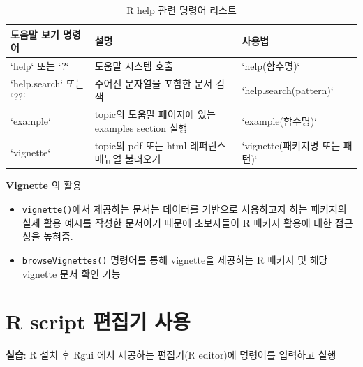 \documentclass[
  11pt,
]{krantz}
\makeatletter
\providecommand{\tightlist}{%
  \setlength{\itemsep}{0pt}\setlength{\parskip}{0pt}}
\newenvironment{kframe}{%
\medskip{}
\setlength{\fboxsep}{.8em}
 \def\at@end@of@kframe{}%
 \ifinner\ifhmode%
  \def\at@end@of@kframe{\end{minipage}}%
  \begin{minipage}{\columnwidth}%
 \fi\fi%
 \def\FrameCommand##1{\hskip\@totalleftmargin \hskip-\fboxsep
 \colorbox{shadecolor}{##1}\hskip-\fboxsep
     \hskip-\linewidth \hskip-\@totalleftmargin \hskip\columnwidth}%
 \MakeFramed {\advance\hsize-\width
   \@totalleftmargin\z@ \linewidth\hsize
   \@setminipage}}%
 {\par\unskip\endMakeFramed%
 \at@end@of@kframe}
\newenvironment{rmdblock}[1]
  {
  \begin{itemize}
  \renewcommand{\labelitemi}{
    \raisebox{-.7\height}[0pt][0pt]{
      {\setkeys{Gin}{width=3em,keepaspectratio}\texttt{[image: images/\#1]}}
    }
  }
  \setlength{\fboxsep}{1em}
  \begin{kframe}
  \item
  }
  {
  \end{kframe}
  \end{itemize}
  }
\newenvironment{rmdimportant}
  {\begin{rmdblock}{important}}
  {\end{rmdblock}}
\newenvironment{rmdtip}
  {\begin{rmdblock}{tip}}
  {\end{rmdblock}}
\makeatother
\begin{document}
\normalsize

\footnotesize

\begin{table}[H]

\caption{\label{tab:tab-help}R help 관련 명령어 리스트}
\centering
\fontsize{10}{12}\selectfont
\begin{tabular}[t]{l>{\raggedright\arraybackslash}p{5cm}l}
\toprule
도움말 보기 명령어 & 설명 & 사용법\\
\midrule
\rowcolor{gray!6}  `help` 또는 `?` & 도움말 시스템 호출 & `help(함수명)`\\
`help.search` 또는 `??` & 주어진 문자열을 포함한 문서 검색 & `help.search(pattern)`\\
\rowcolor{gray!6}  `example` & topic의 도움말 페이지에 있는 examples section 실행 & `example(함수명)`\\
`vignette` & topic의 pdf 또는 html 레퍼런스 메뉴얼 불러오기 & `vignette(패키지명 또는 패턴)`\\
\bottomrule
\end{tabular}
\end{table}

\normalsize

\footnotesize

\begin{rmdtip}
\begin{rmdtip}

\textbf{Vignette} 의 활용

\begin{itemize}
\tightlist
\item
  \texttt{vignette()}에서 제공하는 문서는 데이터를 기반으로 사용하고자 하는 패키지의 실제 활용 예시를 작성한 문서이기 때문에 초보자들이 R 패키지 활용에 대한 접근성을 높혀줌.
\item
  \texttt{browseVignettes()} 명령어를 통해 vignette을 제공하는 R 패키지 및 해당 vignette 문서 확인 가능
\end{itemize}

\end{rmdtip}
\end{rmdtip}

\normalsize

\hypertarget{rconsle-script}{%
\section{R script 편집기 사용}\label{rconsle-script}}

\begin{rmdimportant}
\begin{rmdimportant}

\textbf{실습}: R 설치 후 Rgui 에서 제공하는 편집기(R editor)에 명령어를 입력하고 실행

\end{rmdimportant}
\end{rmdimportant}
\end{document}
